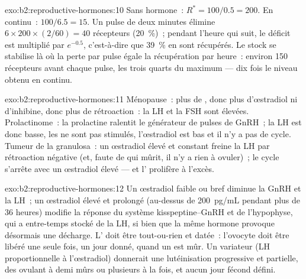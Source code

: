 \begin{solution}{exo:b2:reproductive-hormones:10}
Sans hormone~: $R^* = 100/0.5 = 200$. En continu~: $100/6.5 = 15$. Un
pulse de deux minutes élimine $6\times 200\times(2/60) = 40$ récepteurs
(\qty{20}{\%})~; pendant l'heure qui suit, le déficit est multiplié par
$e^{-0.5}$, c'est-à-dire que \qty{39}{\%} en sont récupérés. Le stock
se stabilise là où la perte par pulse égale la récupération par heure~:
environ 150 récepteurs avant chaque pulse, les trois quarts du maximum
--- dix fois le niveau obtenu en continu.
\end{solution}

\begin{solution}{exo:b2:reproductive-hormones:11}
Ménopause~: plus de , donc plus d'œstradiol ni d'inhibine,
donc plus de rétroaction~: la LH et la FSH sont élevées. Prolactinome~:
la prolactine ralentit le générateur de pulses de GnRH~; la LH est
donc basse, les  ne sont pas stimulés, l'œstradiol est bas et
il n'y a pas de cycle. Tumeur de la granulosa~: un œstradiol élevé et
constant freine la LH par rétroaction négative (et, faute de 
qui mûrit, il n'y a rien à ovuler)~; le cycle s'arrête avec un œstradiol
élevé --- et l' prolifère à l'excès.
\end{solution}

\begin{solution}{exo:b2:reproductive-hormones:12}
Un œstradiol faible ou bref diminue la GnRH et la LH~; un œstradiol
élevé et prolongé (au-dessus de \qty{200}{pg/mL} pendant plus de
36 heures) modifie la réponse du système kisspeptine--GnRH et de
l'hypophyse, qui a entre-temps stocké de la LH, si bien que la même
hormone provoque désormais une décharge. L' doit être
tout-ou-rien et datée~: l'ovocyte doit être libéré une seule fois, un jour
donné, quand un  est mûr. Un variateur (LH proportionnelle à
l'œstradiol) donnerait une lutéinisation progressive et partielle, des
 ovulant à demi mûrs ou plusieurs à la fois, et aucun jour
fécond défini.
\end{solution}


